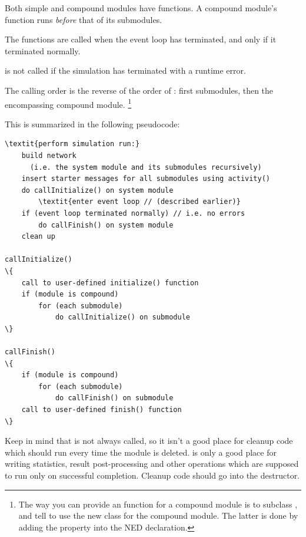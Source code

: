 Both simple and compound modules have  functions. A
compound module's  function runs \textit{before} that of
its submodules.

The  functions are called when the event loop
has terminated, and only if it terminated normally.

\begin{note}
 is not called if the simulation has terminated
with a runtime error.
\end{note}

The calling order is the reverse of the order of : first
submodules, then the encompassing compound module.
  \footnote{The way you can provide an  function
  for a compound module is to subclass , and tell
  {\opp} to use the new class for the compound module. The latter is done
  by adding the  property into the NED declaration.}

This is summarized in the following pseudocode:


\begin{Verbatim}[commandchars=\\\{\}]
\textit{perform simulation run:}
    build network
      (i.e. the system module and its submodules recursively)
    insert starter messages for all submodules using activity()
    do callInitialize() on system module
        \textit{enter event loop // (described earlier)}
    if (event loop terminated normally) // i.e. no errors
        do callFinish() on system module
    clean up

callInitialize()
\{
    call to user-defined initialize() function
    if (module is compound)
        for (each submodule)
            do callInitialize() on submodule
\}

callFinish()
\{
    if (module is compound)
        for (each submodule)
            do callFinish() on submodule
    call to user-defined finish() function
\}
\end{Verbatim}

Keep in mind that  is not always called, so it isn't a
good place for cleanup code which should run every time the module is
deleted.  is only a good place for writing statistics,
result post-processing and other operations  which are supposed to run only on
successful completion. Cleanup code should go into the
destructor.


